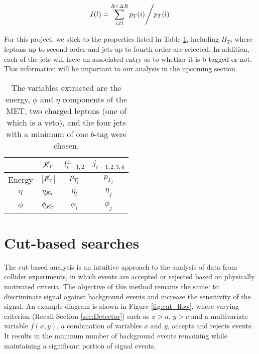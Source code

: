\begin{equation}
    \left. I(l) = \sum\limits_{i\ne l}^{R<\Delta R} p_T(i) \middle/ p_T(l) \right. \\
    \label{eq:iso}
\end{equation}


For this project, we stick to the properties listed in Table \ref{tab:variables}, including $H_T$, where leptons up to second-order and jets up to fourth order are selected. In addition, each of the jets will have an associated entry as to whether it is b-tagged or not. This information will be important to our analysis in the upcoming section. \\ 


\begin{table}[htbp]
    \centering
    \begin{tabular}{c|c|c|c} 
    \toprule
     & $\cancel{\it{E}}_{T}$ & $l^{\pm}_{i=1,2}$ & $j_{i=1,2,3,4}$ \\
    \midrule
    \rowcolor{gray!6} Energy & $\abs{\cancel{\it{E}}_{T}}$ & $ p_{T_l} $ & $ p_{T_j} $ \\
    $\eta$ & $\eta_{\cancel{\it{E}}_{T}}$ & $ \eta_l $ & $ \eta_j $ \\
    \rowcolor{gray!6} $\phi$ & $\phi_{\cancel{\it{E}}_{T}}$ & $ \phi_l $ & $ \phi_j $ \\
    \bottomrule
    \end{tabular}
    \caption{The variables extracted are the energy, $\phi$ and $\eta$ components of the MET, two charged leptons (one of which is a veto), and the four jets with a minimum of one $b$-tag were chosen.} 
    \label{tab:variables}
\end{table}

\section{Cut-based searches}
\label{sec:cut}
The cut-based analysis is an intuitive approach to the analysis of data from collider experiments, in which events are accepted or rejected based on physically motivated criteria. The objective of this method remains the same: to discriminate signal against background events and increase the sensitivity of the signal. An example diagram is shown in Figure \ref{fig:cut_flow}, where varying criterion (Recall Section \ref{sec:Detector}) such as $x>a$, $y>c$ and a multivariate variable $f(x,y)$, a combination of variables $x$ and $y$, accepts and rejects events. It results in the minimum number of background events remaining while maintaining a significant portion of signal events.  \\

